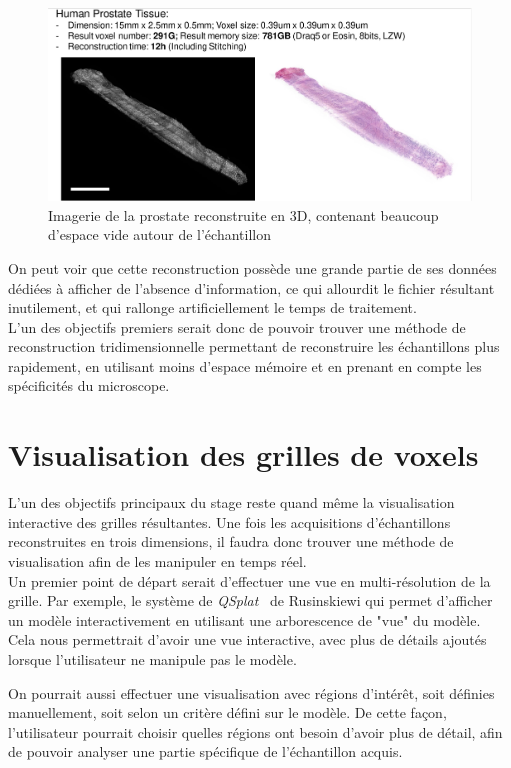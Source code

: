 \documentclass[utf8]{stageM2R}
\begin{document}
{{			\begin{figure}[H]
				\centering
				\includegraphics[width=0.8\linewidth]{./img/tulane_reconstruction_03_prostate.png}
				\caption{Imagerie de la prostate reconstruite en 3D, contenant beaucoup d'espace vide autour de l'échantillon}
				\label{ref_tulane_recon_03_prostate}
			\end{figure}

			On peut voir que cette reconstruction possède une grande partie de ses données dédiées à afficher de l'absence d'information, ce qui allourdit le fichier résultant inutilement, et qui rallonge artificiellement le temps de traitement.\\

			L'un des objectifs premiers serait donc de pouvoir trouver une méthode de reconstruction tridimensionnelle permettant de reconstruire les échantillons plus rapidement, en utilisant moins d'espace mémoire et en prenant en compte les spécificités du microscope.
		}
		\section{Visualisation des grilles de voxels}\label{section:03_02_solution}
		{
			L'un des objectifs principaux du stage reste quand même la visualisation interactive des grilles résultantes. Une fois les acquisitions d'échantillons reconstruites en trois dimensions, il faudra donc trouver une méthode de visualisation afin de les manipuler en temps réel.\\

			Un premier point de départ serait d'effectuer une vue en multi-résolution de la grille. Par exemple, le système de \textit{QSplat}~\cite{rusinkiewicz2000qsplat} de Rusinskiewi qui permet d'afficher un modèle interactivement en utilisant une arborescence de "vue" du modèle. Cela nous permettrait d'avoir une vue interactive, avec plus de détails ajoutés lorsque l'utilisateur ne manipule pas le modèle.

			On pourrait aussi effectuer une visualisation avec régions d'intérêt, soit définies manuellement, soit selon un critère défini sur le modèle. De cette façon, l'utilisateur pourrait choisir quelles régions ont besoin d'avoir plus de détail, afin de pouvoir analyser une partie spécifique de l'échantillon acquis.
		}
}
\end{document}
